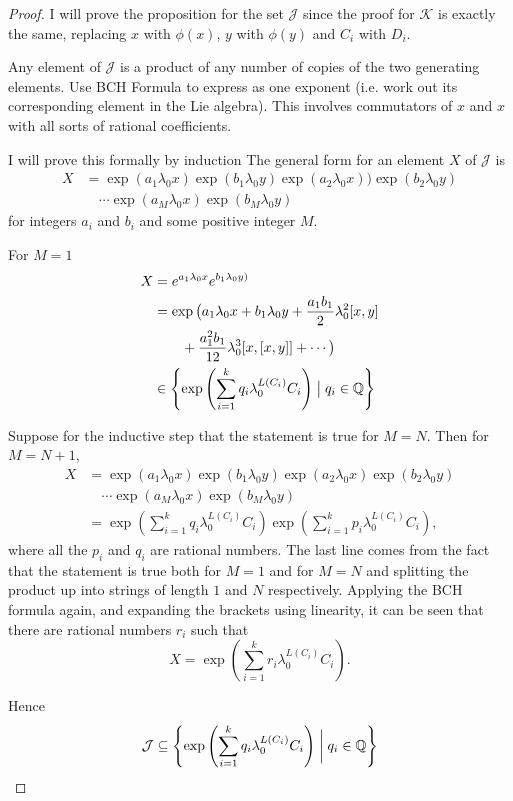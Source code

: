 \documentclass[honours]{UNSWthesis}
\newcommand{\Q}{\mathbb{Q}}
\newcommand{\1}{\mathbf{e}_{1}}
\newcommand{\2}{\mathbf{e}_{3}}
\newcommand{\3}{\mathbf{e}_{3}}
\begin{document}
\begin{proof}
I will prove the proposition for the set $\mathcal{J}$ since the proof for $\mathcal{K}$ is exactly the same, replacing $x$ with $\phi(x)$, $y$ with $\phi(y)$ and $C_i$ with $D_i$.

Any element of $\mathcal{J}$ is a product of any number of copies of the two generating elements. Use BCH Formula to express as one exponent (i.e. work out its corresponding element in the Lie algebra). This involves commutators of $x$ and $x$ with all sorts of rational coefficients.

I will prove this formally by induction
The general form for an element $X$ of $\mathcal{J}$ is
\begin{align*}
X &= \exp{(a_1 \lambda_0 x)}\exp{(b_1 \lambda_0 y)}\exp{(a_2 \lambda_0 x))}\exp{(b_2 \lambda_0 y)} \\
& \quad \cdots \exp{(a_M \lambda_0 x)}\exp{(b_M \lambda_0 y)}
\end{align*}
for integers $a_i$ and $b_i$ and some positive integer $M$. 

For $M=1$
\begin{align*}
X&= e^{a_1 \lambda_0 x}e^{b_1 \lambda_0 y)} \\
&= \exp \big( a_1 \lambda_0 x+b_1 \lambda_0 y+ \frac{a_1 b_1}{2}\lambda_0^2[ x, y]\\
& \quad \quad + \frac{a_1^2 b_1}{12}\lambda_0^3[x,[x,y]]+\cdots \big) \\
&\in \left\lbrace \exp \left( \sum\limits_{i=1}^{k} q_{i}\lambda_{0}^{L(C_{i})}C_{i} \right)\bigm| q_i \in \Q \right\rbrace 
\end{align*}

Suppose for the inductive step that the statement is true for $M=N$. Then for $M=N+1$, 
\begin{align*}
X &= \exp{(a_1 \lambda_0 x)}\exp{(b_1 \lambda_0 y)}\exp{(a_2 \lambda_0 x)}\exp{(b_2 \lambda_0 y)} \\
& \quad \cdots \exp{(a_M \lambda_0 x)}\exp{(b_M \lambda_0 y)} \\
&= \exp \left( \sum\limits_{i=1}^{k} q_{i}\lambda_{0}^{L(C_{i})}C_{i} \right) \exp \left( \sum\limits_{i=1}^{k} p_{i}\lambda_{0}^{L(C_{i})}C_{i} \right),
\end{align*}
where all the $p_i$ and $q_i$ are rational numbers. 
The last line comes from the fact that the statement is true both for $M=1$ and for $M=N$ and splitting the product up into strings of length $1$ and $N$ respectively. Applying the BCH formula again, and expanding the brackets using linearity, it can be seen that there are rational numbers $r_i$ such that 
\[
X=\exp \left( \sum\limits_{i=1}^{k} r_{i}\lambda_{0}^{L(C_{i})}C_{i} \right).
\]

Hence
\[
\mathcal{J} \subseteq \left\lbrace \exp \left( \sum\limits_{i=1}^{k} q_{i}\lambda_{0}^{L(C_{i})}C_{i} \right) \biggm| q_{i} \in \Q \right\rbrace
\]
\end{proof}
\end{document}
